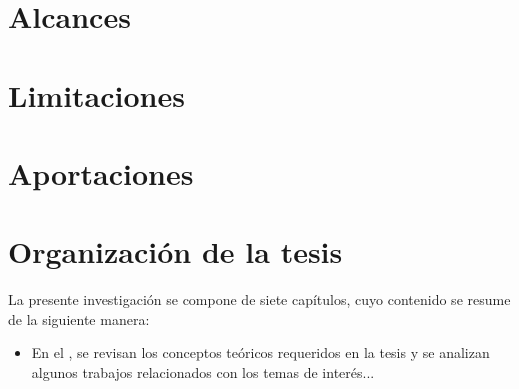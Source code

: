 \section{Alcances}
    
\section{Limitaciones}

\section{Aportaciones}

\section{Organización de la tesis}

     La presente investigación se compone de siete capítulos, cuyo contenido se resume de la siguiente manera:
    \begin{itemize}[noitemsep]
        \item En el  , se revisan los conceptos teóricos requeridos en la tesis y se analizan algunos trabajos relacionados con los temas de interés...
    \end{itemize}